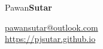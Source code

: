 \documentclass{res}
\begin{document}
	\hspace*{-0.05\textwidth}
	\begin{minipage}[t]{0.6\textwidth}
	\begin{flushleft}
	\vspace*{\fill}
	{\fontsize{45}{45}\selectfont Pawan\textbf{Sutar}}
	\end{flushleft}
	\end{minipage}
	\begin{minipage}[t]{0.44\textwidth}
	\begin{flushright}
	\href{mailto:pawansutar@outlook.com}{pawansutar@outlook.com} \\ \url{https://pjsutar.github.io} \\ 
	\end{flushright}
	\end{minipage}
\end{document}
